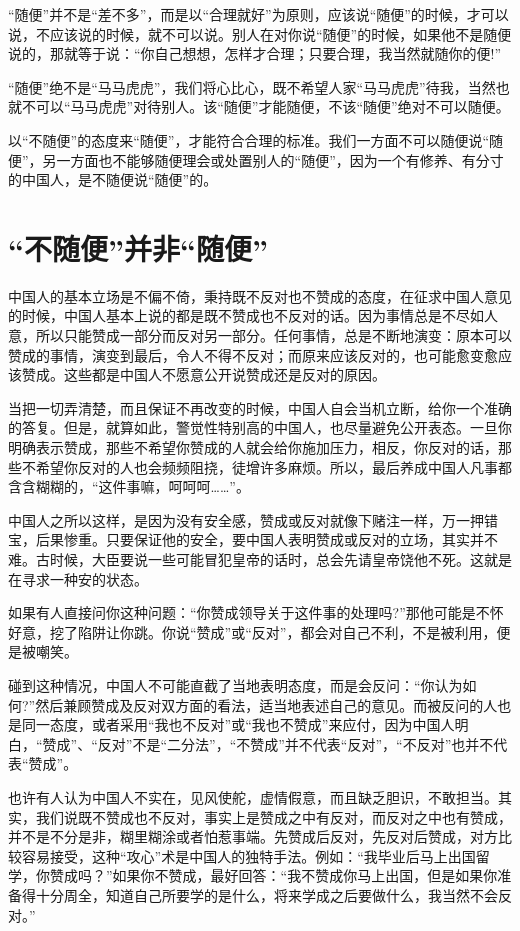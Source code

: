 \documentclass[fontset=fandol, a4paper, 12pt, openright]{ctexbook}
\begin{document}
“随便”并不是“差不多”，而是以“合理就好”为原则，应该说“随便”的时候，才可以说，不应该说的时候，就不可以说。别人在对你说“随便”的时候，如果他不是随便说的，那就等于说：“你自己想想，怎样才合理；只要合理，我当然就随你的便!”

“随便”绝不是“马马虎虎”，我们将心比心，既不希望人家“马马虎虎”待我，当然也就不可以“马马虎虎”对待别人。该“随便”才能随便，不该“随便”绝对不可以随便。

以“不随便”的态度来“随便”，才能符合合理的标准。我们一方面不可以随便说“随便”，另一方面也不能够随便理会或处置别人的“随便”，因为一个有修养、有分寸的中国人，是不随便说“随便”的。

\section{“不随便”并非“随便”}

中国人的基本立场是不偏不倚，秉持既不反对也不赞成的态度，在征求中国人意见的时候，中国人基本上说的都是既不赞成也不反对的话。因为事情总是不尽如人意，所以只能赞成一部分而反对另一部分。任何事情，总是不断地演变：原本可以赞成的事情，演变到最后，令人不得不反对；而原来应该反对的，也可能愈变愈应该赞成。这些都是中国人不愿意公开说赞成还是反对的原因。

当把一切弄清楚，而且保证不再改变的时候，中国人自会当机立断，给你一个准确的答复。但是，就算如此，警觉性特别高的中国人，也尽量避免公开表态。一旦你明确表示赞成，那些不希望你赞成的人就会给你施加压力，相反，你反对的话，那些不希望你反对的人也会频频阻挠，徒增许多麻烦。所以，最后养成中国人凡事都含含糊糊的，“这件事嘛，呵呵呵……”。

中国人之所以这样，是因为没有安全感，赞成或反对就像下赌注一样，万一押错宝，后果惨重。只要保证他的安全，要中国人表明赞成或反对的立场，其实并不难。古时候，大臣要说一些可能冒犯皇帝的话时，总会先请皇帝饶他不死。这就是在寻求一种安的状态。

如果有人直接问你这种问题：“你赞成领导关于这件事的处理吗?”那他可能是不怀好意，挖了陷阱让你跳。你说“赞成”或“反对”，都会对自己不利，不是被利用，便是被嘲笑。

碰到这种情况，中国人不可能直截了当地表明态度，而是会反问：“你认为如何?”然后兼顾赞成及反对双方面的看法，适当地表述自己的意见。而被反问的人也是同一态度，或者采用“我也不反对”或“我也不赞成”来应付，因为中国人明白，“赞成”、“反对”不是“二分法”，“不赞成”并不代表“反对”，“不反对”也并不代表“赞成”。

也许有人认为中国人不实在，见风使舵，虚情假意，而且缺乏胆识，不敢担当。其实，我们说既不赞成也不反对，事实上是赞成之中有反对，而反对之中也有赞成，并不是不分是非，糊里糊涂或者怕惹事端。先赞成后反对，先反对后赞成，对方比较容易接受，这种“攻心”术是中国人的独特手法。例如：“我毕业后马上出国留学，你赞成吗？”如果你不赞成，最好回答：“我不赞成你马上出国，但是如果你准备得十分周全，知道自己所要学的是什么，将来学成之后要做什么，我当然不会反对。”
\end{document}
